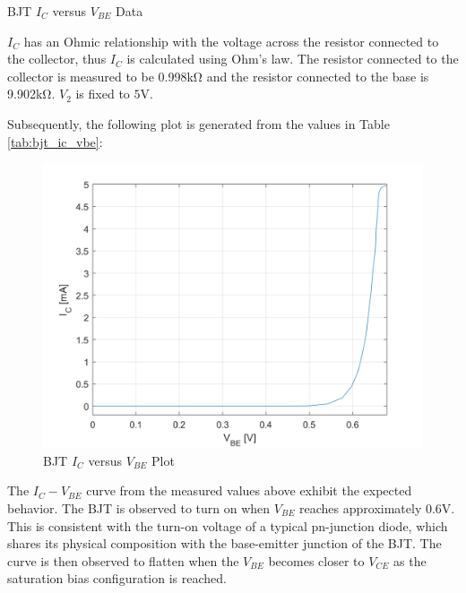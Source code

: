 \FloatBarrier

\begin{table}[h!]
	\centering
	\caption{BJT $I_C$ versus $V_{BE}$ Data}
	\label{tab:bjt_ic_vbe}
\end{table}

\FloatBarrier

{\footnotesize $I_C$ has an Ohmic relationship with the voltage across the resistor connected to the collector, thus $I_C$ is calculated using Ohm's law. The resistor connected to the collector is measured to be 0.998\si{\kilo\ohm} and the resistor connected to the base is 9.902\si{\kilo\ohm}. $V_2$ is fixed to $5$\si{\volt}.}

\FloatBarrier

Subsequently, the following plot is generated from the values in Table \ref{tab:bjt_ic_vbe}:

\begin{figure}[h!]
	\centering
	\includegraphics[scale=0.4]{./images/bjt_ic_vbe.PNG}
	\caption{BJT $I_C$ versus $V_{BE}$ Plot}
	\label{fig:bjt_ic_vbe}
\end{figure}

\FloatBarrier

The $I_C - V_{BE}$ curve from the measured values above exhibit the expected behavior. The BJT is observed to turn on when $V_{BE}$ reaches approximately 0.6V. This is consistent with the turn-on voltage of a typical pn-junction diode, which shares its physical composition with the base-emitter junction of the BJT. The curve is then observed to flatten when the $V_{BE}$ becomes closer to $V_{CE}$ as the saturation bias configuration is reached.

